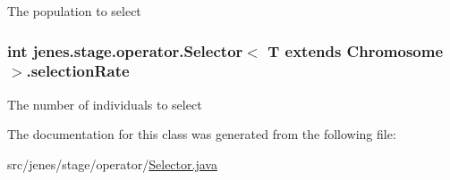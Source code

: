 The population to select \hypertarget{classjenes_1_1stage_1_1operator_1_1_selector_3_01_t_01extends_01_chromosome_01_4_a11b6117214c1a39e14d203743a791a72}{
\subsubsection[{selection\-Rate}]{\setlength{\rightskip}{0pt plus 5cm}int jenes.\-stage.\-operator.\-Selector$<$ T extends Chromosome $>$.selection\-Rate\hspace{0.3cm}{\ttfamily [private]}}}\label{classjenes_1_1stage_1_1operator_1_1_selector_3_01_t_01extends_01_chromosome_01_4_a11b6117214c1a39e14d203743a791a72}
The number of individuals to select 

The documentation for this class was generated from the following file\-:\begin{DoxyCompactItemize}
\item 
src/jenes/stage/operator/\hyperlink{_selector_8java}{Selector.\-java}\end{DoxyCompactItemize}
